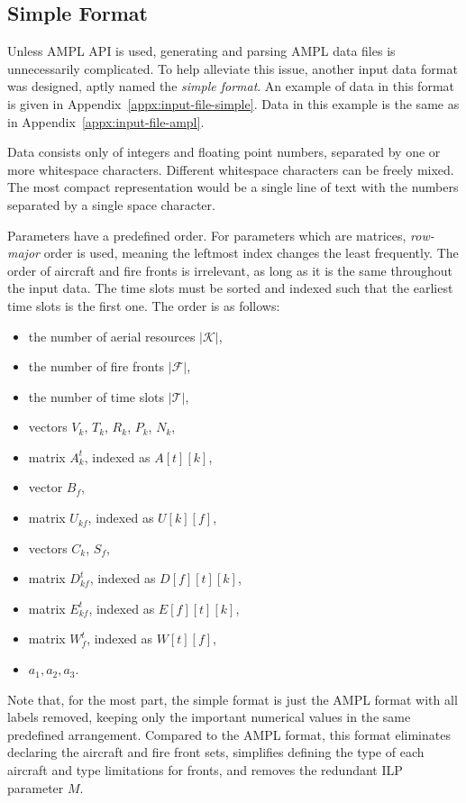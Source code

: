 \subsection{Simple Format}

Unless AMPL API is used, generating and parsing AMPL data files is unnecessarily complicated.
To help alleviate this issue, another input data format was designed, aptly named the \textit{simple format}.
An example of data in this format is given in Appendix~\ref{appx:input-file-simple}.
Data in this example is the same as in Appendix~\ref{appx:input-file-ampl}.

Data consists only of integers and floating point numbers, separated by one or more whitespace characters.
Different whitespace characters can be freely mixed.
The most compact representation would be a single line of text with the numbers separated by a single space character.

Parameters have a predefined order.
For parameters which are matrices, \textit{row-major} order is used, meaning the leftmost index changes the least frequently.
The order of aircraft and fire fronts is irrelevant, as long as it is the same throughout the input data.
The time slots must be sorted and indexed such that the earliest time slots is the first one.
The order is as follows:
\begin{itemize}
    \item the number of aerial resources $\vert \mathcal{K} \vert$,
    \item the number of fire fronts $\vert \mathcal{F} \vert$,
    \item the number of time slots $\vert \mathcal{T} \vert$,
    \item vectors $V_k$, $T_k$, $R_k$, $P_k$, $N_k$,
    \item matrix $A^t_k$, indexed as $A[t][k]$,
    \item vector $B_f$,
    \item matrix $U_{kf}$, indexed as $U[k][f]$,
    \item vectors $C_k$, $S_f$,
    \item matrix $D^t_{kf}$, indexed as $D[f][t][k]$,
    \item matrix $E^t_{kf}$, indexed as $E[f][t][k]$,
    \item matrix $W^t_f$, indexed as $W[t][f]$,
    \item $a_1, a_2, a_3$.
\end{itemize}

Note that, for the most part, the simple format is just the AMPL format with all labels removed, keeping only the important numerical values in the same predefined arrangement.
Compared to the AMPL format, this format eliminates declaring the aircraft and fire front sets, simplifies defining the type of each aircraft and type limitations for fronts, and removes the redundant ILP parameter $M$.

